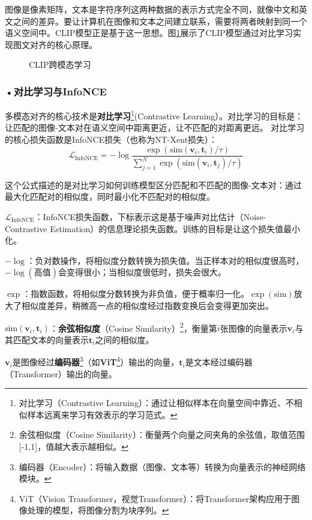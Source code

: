 图像是像素矩阵，文本是字符序列这两种数据的表示方式完全不同，就像中文和英文之间的差异。要让计算机在图像和文本之间建立联系，需要将两者映射到同一个语义空间中。CLIP模型正是基于这一思想。图\ref{fig:ch2_2_31}展示了CLIP模型通过对比学习实现图文对齐的核心原理。

\begin{figure}[H]
\centering
{}
\caption{CLIP跨模态学习}
\label{fig:ch2_2_31}
\end{figure}

\subsubsection*{\textbf{•对比学习与InfoNCE}}

多模态对齐的核心技术是\textbf{对比学习}\footnote{对比学习（Contrastive Learning）：通过让相似样本在向量空间中靠近、不相似样本远离来学习有效表示的学习范式。}(Contrastive Learning）。对比学习的目标是：让匹配的图像-文本对在语义空间中距离更近，让不匹配的对距离更远。
对比学习的核心损失函数是InfoNCE损失（也称为NT-Xent损失）：
\[
\mathcal{L}_{\text{InfoNCE}} = -\log \frac{\exp(\text{sim}(\mathbf{v}_i, \mathbf{t}_i) / \tau)}{\sum_{j=1}^{N} \exp(\text{sim}(\mathbf{v}_i, \mathbf{t}_j) / \tau)}
\]

这个公式描述的是对比学习如何训练模型区分匹配和不匹配的图像-文本对：通过最大化匹配对的相似度，同时最小化不匹配对的相似度。

$\mathcal{L}_{\text{InfoNCE}}$：InfoNCE损失函数，下标表示这是基于噪声对比估计（Noise-Contrastive Estimation）的信息理论损失函数。训练的目标是让这个损失值最小化。

$-\log$：负对数操作，将相似度分数转换为损失值。当正样本对的相似度很高时，$-\log(\text{高值})$会变得很小；当相似度很低时，损失会很大。

$\exp$：指数函数，将相似度分数转换为非负值，便于概率归一化。$\exp(\text{sim})$放大了相似度差异，稍微高一点的相似度经过指数变换后会变得更加突出。

$\text{sim}(\mathbf{v}_i, \mathbf{t}_i)$：\textbf{余弦相似度}（Cosine Similarity）\footnote{余弦相似度（Cosine Similarity）：衡量两个向量之间夹角的余弦值，取值范围[-1,1]，值越大表示越相似。}，衡量第$i$张图像的向量表示$\mathbf{v}_i$与其匹配文本的向量表示$\mathbf{t}_i$之间的相似度。

$\mathbf{v}_i$是图像经过\textbf{编码器}\footnote{编码器（Encoder）：将输入数据（图像、文本等）转换为向量表示的神经网络模块。}（如\textbf{ViT}\footnote{ViT（Vision Transformer，视觉Transformer）：将Transformer架构应用于图像处理的模型，将图像分割为块序列。}）输出的向量，$\mathbf{t}_i$是文本经过编码器（Transformer）输出的向量。

